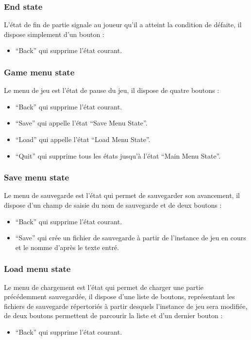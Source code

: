 \documentclass[a4paper]{article}
\newcommand{\alinea}{\hspace*{0.5cm}}
\begin{document}
			\subsubsection{End state}
			       \alinea L’état de fin de partie signale au joueur qu’il a atteint la condition de défaite, il dispose simplement d’un bouton :
			       \begin{itemize}[label=-] 
			             \item “Back” qui supprime l’état courant.
			        \end{itemize}
			\subsubsection{Game menu state}
				\alinea Le menu de jeu est l’état de pause du jeu, il dispose de quatre boutons :
	 		        \begin{itemize}[label=-] 
			             \item “Back” qui supprime l’état courant.
			             \item “Save” qui appelle l’état “Save Menu State”.
				  \item “Load” qui appelle l’état “Load Menu State”.
				  \item “Quit” qui supprime tous les états jusqu’à l’état “Main Menu State”.
			        \end{itemize}
			\subsubsection{Save menu state}
				\alinea Le menu de sauvegarde est l’état qui permet de sauvegarder son avancement, il dispose d’un champ de saisie du nom de sauvegarde et de deux boutons :
	 		        \begin{itemize}[label=-] 
			             \item “Back” qui supprime l’état courant.
			             \item “Save” qui crée un fichier de sauvegarde à partir de l’instance de jeu en cours et le nomme d’après le texte entré.
			        \end{itemize}
			\subsubsection{Load menu state}
				\alinea Le menu de chargement est l’état qui permet de charger une partie précédemment sauvegardée, il dispose d’une liste de boutons, représentant les fichiers de sauvegarde répertoriés à partir desquels l’instance de jeu sera modifiée, de deux boutons permettent de parcourir la liste et d’un dernier bouton :
	 		        \begin{itemize}[label=-] 
			             \item “Back” qui supprime l’état courant.
			        \end{itemize}
			
\end{document}
